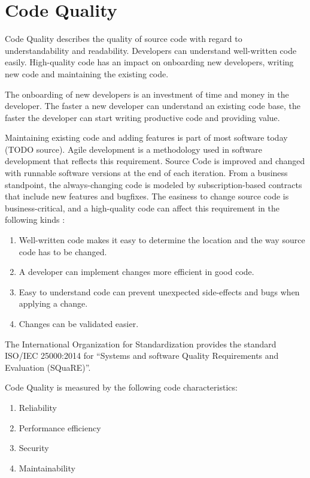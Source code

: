 \section{Code Quality}
Code Quality describes the quality of source code with regard to understandability and readability. Developers can understand well-written code easily. 
High-quality code has an impact on onboarding new developers, writing new code and maintaining the existing code.

The onboarding of new developers is an investment of time and money in the developer. The faster a new developer can understand an existing code base, the faster the developer can start writing productive code and providing value.

Maintaining existing code and adding features is part of most software today (TODO source). Agile development is a methodology used in software development that reflects this requirement. Source Code is improved and changed with runnable software versions at the end of each iteration.
From a business standpoint, the always-changing code is modeled by subscription-based contracts that include new features and bugfixes. The easiness to change source code is business-critical, and a high-quality code can affect this requirement in the following kinds \cite{baggen_standardized_2012}:

\begin{enumerate}
    \item Well-written code makes it easy to determine the location and the way source code has to be changed.
    \item A developer can implement changes more efficient in good code.
    \item Easy to understand code can prevent unexpected side-effects and bugs when applying a change.
    \item Changes can be validated easier. 
\end{enumerate}

The International Organization for Standardization provides the standard ISO/IEC 25000:2014 for \enquote{Systems and software Quality Requirements and Evaluation (SQuaRE)}\cite{iso_central_secretary_systems_2014}.

Code Quality is measured by the following code characteristics:
\begin{enumerate}
    \item Reliability
    \item Performance efficiency
    \item Security
    \item Maintainability
\end{enumerate}

